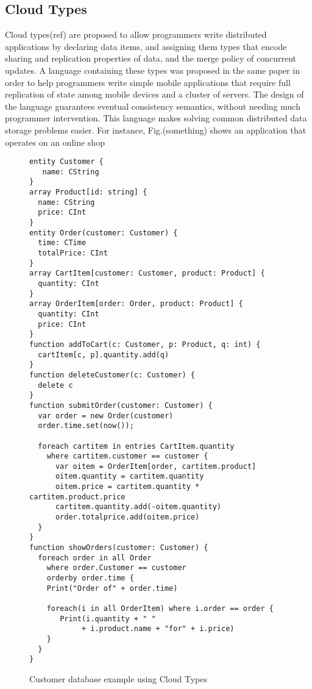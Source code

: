 \subsection{Cloud Types}
Cloud types(ref) are proposed to allow programmers write distributed applications by
declaring data items, and assigning them types that encode sharing and
replication properties of data, and the merge policy of concurrent updates. A language containing 
these types was proposed in the same paper in order to help programmers
write simple mobile applications that require full replication of state among mobile
devices and a cluster of servers. The design of the language guarantees eventual
consistency semantics, without needing much programmer intervention. This
language makes solving common distributed data storage problems easier. For
instance, Fig.(something) shows an application that operates on an online shop
\begin{figure}[tp]
\begin{lstlisting}
entity Customer {
   name: CString
}
array Product[id: string] {
  name: CString
  price: CInt
}
entity Order(customer: Customer) {
  time: CTime
  totalPrice: CInt
}
array CartItem[customer: Customer, product: Product] {
  quantity: CInt
}
array OrderItem[order: Order, product: Product] {
  quantity: CInt
  price: CInt
}
function addToCart(c: Customer, p: Product, q: int) {
  cartItem[c, p].quantity.add(q)
}
function deleteCustomer(c: Customer) {
  delete c
}
function submitOrder(customer: Customer) {
  var order = new Order(customer)
  order.time.set(now());

  foreach cartitem in entries CartItem.quantity 
    where cartitem.customer == customer {
      var oitem = OrderItem[order, cartitem.product]
      oitem.quantity = cartitem.quantity
      oitem.price = cartitem.quantity * cartitem.product.price
      cartitem.quantity.add(-oitem.quantity)
      order.totalprice.add(oitem.price)
  }
}
function showOrders(customer: Customer) {
  foreach order in all Order
    where order.Customer == customer
    orderby order.time {    
    Print("Order of" + order.time)
    
    foreach(i in all OrderItem) where i.order == order {
       Print(i.quantity + " " 
            + i.product.name + "for" + i.price)
    }
  }
}
\end{lstlisting}
\caption{Customer database example using Cloud Types} 
\label{lst:ctStore}
\end{figure}

